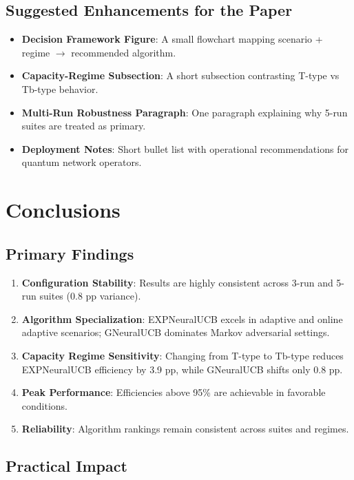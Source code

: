 \documentclass[11pt,a4paper]{article}
\begin{document}
\subsection{Suggested Enhancements for the Paper}

\begin{itemize}
\item \textbf{Decision Framework Figure}: A small flowchart mapping scenario + regime $\rightarrow$ recommended algorithm.
\item \textbf{Capacity-Regime Subsection}: A short subsection contrasting T-type vs Tb-type behavior.
\item \textbf{Multi-Run Robustness Paragraph}: One paragraph explaining why 5-run suites are treated as primary.
\item \textbf{Deployment Notes}: Short bullet list with operational recommendations for quantum network operators.
\end{itemize}

\section{Conclusions}

\subsection{Primary Findings}

\begin{enumerate}
\item \textbf{Configuration Stability}: Results are highly consistent across 3-run and 5-run suites (0.8 pp variance).
\item \textbf{Algorithm Specialization}: EXPNeuralUCB excels in adaptive and online adaptive scenarios; GNeuralUCB dominates Markov adversarial settings.
\item \textbf{Capacity Regime Sensitivity}: Changing from T-type to Tb-type reduces EXPNeuralUCB efficiency by 3.9 pp, while GNeuralUCB shifts only 0.8 pp.
\item \textbf{Peak Performance}: Efficiencies above 95\% are achievable in favorable conditions.
\item \textbf{Reliability}: Algorithm rankings remain consistent across suites and regimes.
\end{enumerate}

\subsection{Practical Impact}
\end{document}

